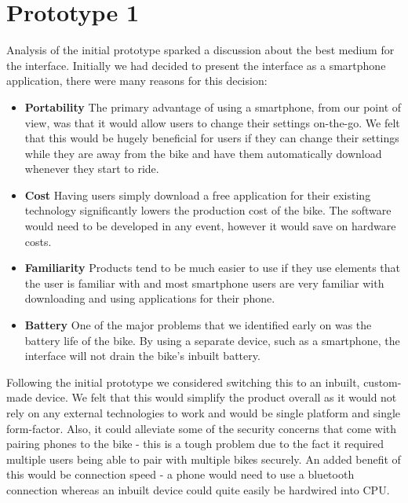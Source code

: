 \documentclass[a4paper]{report}
\begin{document}
\section{Prototype 1}
\label{sec:phones}
Analysis of the initial prototype sparked a discussion about the best medium for the interface. Initially we had decided to present the interface as a smartphone application, there were many reasons for this decision:
\begin{itemize}
  \item \textbf{Portability} The primary advantage of using a smartphone, from our point of view, was that it would allow users to change their settings on-the-go. We felt that this would be hugely beneficial for users if they can change their settings while they are away from the bike and have them automatically download whenever they start to ride. 
  \item \textbf{Cost} Having users simply download a free application for their existing technology significantly lowers the production cost of the bike. The software would need to be developed in any event, however it would save on hardware costs. 
  \item \textbf{Familiarity} Products tend to be much easier to use if they use elements that the user is familiar with and most smartphone users are very familiar with downloading and using applications for their phone.
  \item \textbf{Battery} One of the major problems that we identified early on was the battery life of the bike. By using a separate device, such as a smartphone, the interface will not drain the bike's inbuilt battery.
\end{itemize}
Following the initial prototype we considered switching this to an inbuilt, custom-made device. We felt that this would simplify the product overall as it would not rely on any external technologies to work and would be single platform and single form-factor. Also, it could alleviate some of the security concerns that come with pairing phones to the bike - this is a tough problem due to the fact it required multiple users being able to pair with multiple bikes securely. An added benefit of this would be connection speed - a phone would need to use a bluetooth connection whereas an inbuilt device could quite easily be hardwired into CPU.
\end{document}
